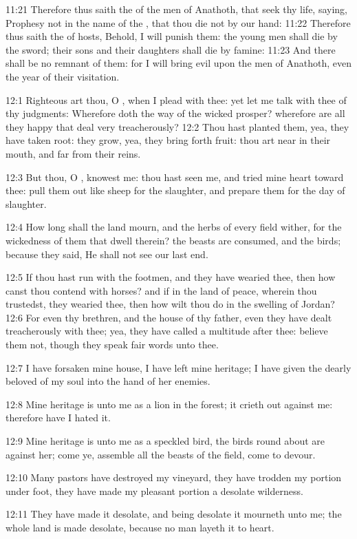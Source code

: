 11:21 Therefore thus saith the \LORD of the men of Anathoth, that seek thy life, saying, Prophesy not in the name of the \LORD, that thou die not by our hand: 11:22 Therefore thus saith the \LORD of hosts, Behold, I will punish them: the young men shall die by the sword; their sons and their daughters shall die by famine: 11:23 And there shall be no remnant of them: for I will bring evil upon the men of Anathoth, even the year of their visitation.

12:1 Righteous art thou, O \LORD, when I plead with thee: yet let me talk with thee of thy judgments: Wherefore doth the way of the wicked prosper?  wherefore are all they happy that deal very treacherously?  12:2 Thou hast planted them, yea, they have taken root: they grow, yea, they bring forth fruit: thou art near in their mouth, and far from their reins.

12:3 But thou, O \LORD, knowest me: thou hast seen me, and tried mine heart toward thee: pull them out like sheep for the slaughter, and prepare them for the day of slaughter.

12:4 How long shall the land mourn, and the herbs of every field wither, for the wickedness of them that dwell therein? the beasts are consumed, and the birds; because they said, He shall not see our last end.

12:5 If thou hast run with the footmen, and they have wearied thee, then how canst thou contend with horses? and if in the land of peace, wherein thou trustedst, they wearied thee, then how wilt thou do in the swelling of Jordan?  12:6 For even thy brethren, and the house of thy father, even they have dealt treacherously with thee; yea, they have called a multitude after thee: believe them not, though they speak fair words unto thee.

12:7 I have forsaken mine house, I have left mine heritage; I have given the dearly beloved of my soul into the hand of her enemies.

12:8 Mine heritage is unto me as a lion in the forest; it crieth out against me: therefore have I hated it.

12:9 Mine heritage is unto me as a speckled bird, the birds round about are against her; come ye, assemble all the beasts of the field, come to devour.

12:10 Many pastors have destroyed my vineyard, they have trodden my portion under foot, they have made my pleasant portion a desolate wilderness.

12:11 They have made it desolate, and being desolate it mourneth unto me; the whole land is made desolate, because no man layeth it to heart.

